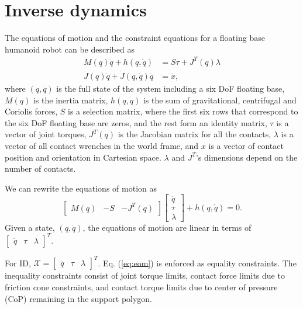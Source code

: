 \documentclass{ws-ijhr}
\newcommand{\eref}[1] {Eq. (\ref{#1})}
\newcommand{\QPx}{\mathcal{X}}
\begin{document}
\section{Inverse dynamics}
\label{sec:ID}
The equations of motion and the constraint equations for a floating base humanoid 
robot can be described as
\begin{equation}
  \begin{split}
    M(q)\ddot{q} + h(q,\dot{q}) &= S\tau + J^T(q)\lambda \\
    J(q)\ddot{q} + \dot{J}(q,\dot{q})\dot{q} &= \ddot{x},
  \end{split}
\end{equation}
where $(q,\dot{q})$ is the full state of the system including a six DoF floating 
base, $M(q)$ is the inertia matrix, $h(q,\dot{q})$ 
is the sum of gravitational, centrifugal and Coriolis forces, $S$ is a selection
matrix, where the first six rows that correspond to the six DoF floating base are 
zeros, and the rest form an identity matrix, $\tau$ is a vector of joint torques, 
$J^T(q)$ is the Jacobian matrix for all the contacts, $\lambda$ is a vector
of all contact wrenches in the world frame, and $x$ is a vector of  
contact position and orientation in Cartesian space. $\lambda$ and $J^T$'s 
dimensions depend on the number of contacts. 

We can rewrite the equations of motion as 
\begin{equation}
  \begin{bmatrix} M(q) & -S & -J^T(q) \end{bmatrix} 
  \begin{bmatrix} \ddot{q} \\ \tau \\ \lambda \end{bmatrix}
  +h(q,\dot{q}) = 0.
		\label{eq:eom}
\end{equation}
Given a state, $(q,\dot{q})$, the equations of motion are linear in terms of 
$\begin{bmatrix} \ddot{q} & \tau & \lambda \end{bmatrix}^T$. 

For ID, $\QPx = \begin{bmatrix} \ddot{q} & \tau & \lambda \end{bmatrix}^T$.
\eref{eq:eom} is enforced as equality constraints. The 
inequality constraints consist of joint torque limits, contact force limits 
due to friction cone constraints, and contact torque limits due to center of 
pressure (CoP) remaining in the support polygon. 
\end{document}
